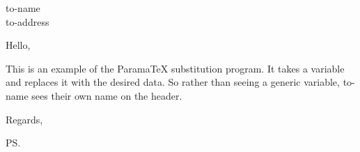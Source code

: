 \documentclass[a4paper,12pt]{letter}
\begin{document}
\begin{letter}{{to-name}\\{to-address}}

\opening{Hello,} %
This is an example of the ParamaTeX substitution program. It takes a variable and replaces it with the desired data. So rather than seeing a generic variable, {to-name} sees their own name on the header. 


\closing{Regards,} %

\cc{} %
\encl{} %
\ps{} %

\end{letter}
\end{document}
